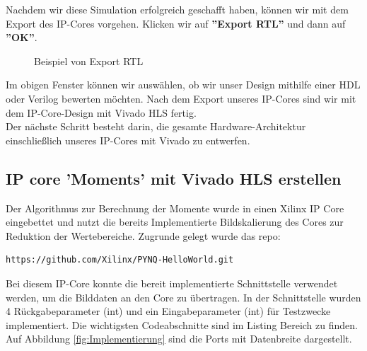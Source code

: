\documentclass[a4paper]{report}
\begin{document}
Nachdem wir diese Simulation erfolgreich geschafft haben, können wir mit dem Export des IP-Cores vorgehen.
Klicken wir auf \textbf{''Export RTL''} und dann auf \textbf{''OK''}.\\

\begin{figure}[H]
\centering
{}
\caption{Beispiel von Export RTL}
\label{fig:Export_RTL}
\end{figure}


Im obigen Fenster können wir auswählen, ob wir unser Design mithilfe einer HDL oder Verilog bewerten möchten.
Nach dem Export unseres IP-Cores sind wir mit dem IP-Core-Design mit Vivado HLS fertig.\\

Der nächste Schritt besteht darin, die gesamte Hardware-Architektur einschließlich unseres IP-Cores mit Vivado zu entwerfen.

\subsection{IP core 'Moments' mit Vivado HLS erstellen}

Der Algorithmus zur Berechnung der Momente wurde in einen Xilinx IP Core eingebettet und nutzt die bereits Implementierte Bildskalierung des Cores zur Reduktion der Wertebereiche. Zugrunde gelegt wurde das repo:

\begin{verbatim}
https://github.com/Xilinx/PYNQ-HelloWorld.git
\end{verbatim}

Bei diesem IP-Core konnte die bereit implementierte Schnittstelle verwendet werden, um die Bilddaten an den Core zu übertragen. In der Schnittstelle wurden 4 Rückgabeparameter (int) und ein Eingabeparameter (int) für Testzwecke implementiert. Die wichtigsten Codeabschnitte sind im Listing Bereich zu finden. Auf Abbildung \ref{fig:Implementierung} sind die Ports mit Datenbreite dargestellt.
\end{document}
